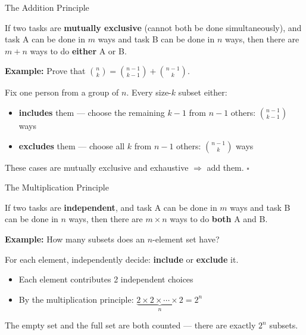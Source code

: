 
\begin{frame}{The Addition Principle}
  \begin{sqt:definition}
    If two tasks are \textbf{mutually exclusive} (cannot both be done simultaneously),
    and task A can be done in $m$ ways and task B can be done in $n$ ways,
    then there are $m + n$ ways to do \textbf{either} A or B.
  \end{sqt:definition}

  \textcolor{sqt-question}{
    \textbf{Example:} Prove that $\displaystyle\binom{n}{k} = \binom{n-1}{k-1} + \binom{n-1}{k}$.
  }

  \pause

  Fix one person from a group of $n$. Every size-$k$ subset either:
  \begin{itemize}
    \item \textbf{includes} them — choose the remaining $k-1$ from $n-1$ others: $\binom{n-1}{k-1}$ ways
    \item \textbf{excludes} them — choose all $k$ from $n-1$ others: $\binom{n-1}{k}$ ways
  \end{itemize}
  These cases are mutually exclusive and exhaustive $\Rightarrow$ add them. $\square$
\end{frame}

\begin{frame}{The Multiplication Principle}
  \begin{sqt:definition}
    If two tasks are \textbf{independent}, and task A can be done in $m$ ways
    and task B can be done in $n$ ways, then there are $m \times n$ ways to do
    \textbf{both} A and B.
  \end{sqt:definition}

  \textcolor{sqt-question}{
    \textbf{Example:} How many subsets does an $n$-element set have?
  }

  \pause

  For each element, independently decide: \textbf{include} or \textbf{exclude} it.
  \begin{itemize}
    \item Each element contributes 2 independent choices
    \item By the multiplication principle: $\underbrace{2 \times 2 \times \cdots \times 2}_{n} = 2^n$
  \end{itemize}

  \begin{sqt:tip}[Note]
    The empty set and the full set are both counted — there are exactly $2^n$ subsets.
  \end{sqt:tip}
\end{frame}

